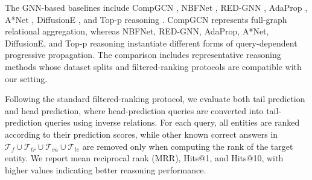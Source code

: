 \documentclass[a4paper,fleqn]{cas-dc}
\begin{document}
The GNN-based baselines include CompGCN \citep{Vashishth2020CompGCN}, NBFNet \citep{Zhu2021NBFNet}, RED-GNN \citep{Zhang2022REDGNN}, AdaProp \citep{Zhang2023AdaProp}, A*Net \citep{Zhu2023AStarNet}, DiffusionE \citep{Cao2024DiffusionE}, and Top-p reasoning \citep{Liu2025TopPReasoning}. CompGCN represents full-graph relational aggregation, whereas NBFNet, RED-GNN, AdaProp, A*Net, DiffusionE, and Top-p reasoning instantiate different forms of query-dependent progressive propagation. The comparison includes representative reasoning methods whose dataset splits and filtered-ranking protocols are compatible with our setting.

Following the standard filtered-ranking protocol, we evaluate both tail prediction and head prediction, where head-prediction queries are converted into tail-prediction queries using inverse relations. For each query, all entities are ranked according to their prediction scores, while other known correct answers in $\mathcal{T}_{f}\cup\mathcal{T}_{tr}\cup\mathcal{T}_{va}\cup\mathcal{T}_{te}$ are removed only when computing the rank of the target entity. We report mean reciprocal rank (MRR), Hits@1, and Hits@10, with higher values indicating better reasoning performance.
\end{document}
